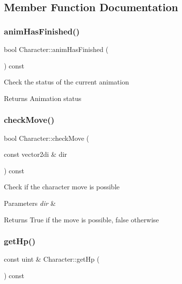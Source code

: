 \subsection{Member Function Documentation}
\mbox{\label{class_character_a0859c556bbe019f325b2ec889331c256}} 
\subsubsection{\texorpdfstring{animHasFinished()}{animHasFinished()}}
{\footnotesize\ttfamily bool Character\+::anim\+Has\+Finished (\begin{DoxyParamCaption}{ }\end{DoxyParamCaption}) const}

Check the status of the current animation \begin{DoxyReturn}{Returns}
Animation status 
\end{DoxyReturn}
\mbox{\label{class_character_a21ce12e24615da73ddc5877f585cb82b}} 
\subsubsection{\texorpdfstring{checkMove()}{checkMove()}}
{\footnotesize\ttfamily bool Character\+::check\+Move (\begin{DoxyParamCaption}\item[{const vector2di \&}]{dir }\end{DoxyParamCaption}) const}

Check if the character move is possible 
\begin{DoxyParams}{Parameters}
{\em dir} & \\
\hline
\end{DoxyParams}
\begin{DoxyReturn}{Returns}
True if the move is possible, false otherwise 
\end{DoxyReturn}
\mbox{\label{class_character_a40f5b2baaf938cfb0652d249d7b5cc21}} 
\subsubsection{\texorpdfstring{getHp()}{getHp()}}
{\footnotesize\ttfamily const uint \& Character\+::get\+Hp (\begin{DoxyParamCaption}{ }\end{DoxyParamCaption}) const}

